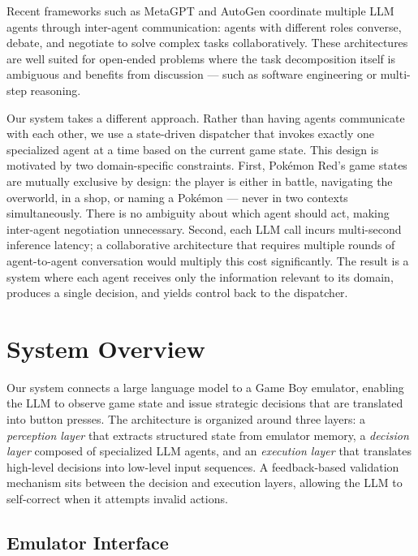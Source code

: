 \documentclass{article}
\begin{document}
Recent frameworks such as MetaGPT \citep{hong2024metagpt} and AutoGen \citep{wu2023autogen} coordinate multiple LLM agents through inter-agent communication: agents with different roles converse, debate, and negotiate to solve complex tasks collaboratively. These architectures are well suited for open-ended problems where the task decomposition itself is ambiguous and benefits from discussion --- such as software engineering or multi-step reasoning.

Our system takes a different approach. Rather than having agents communicate with each other, we use a state-driven dispatcher that invokes exactly one specialized agent at a time based on the current game state. This design is motivated by two domain-specific constraints. First, Pok\'{e}mon Red's game states are mutually exclusive by design: the player is either in battle, navigating the overworld, in a shop, or naming a Pok\'{e}mon --- never in two contexts simultaneously. There is no ambiguity about which agent should act, making inter-agent negotiation unnecessary. Second, each LLM call incurs multi-second inference latency; a collaborative architecture that requires multiple rounds of agent-to-agent conversation would multiply this cost significantly. The result is a system where each agent receives only the information relevant to its domain, produces a single decision, and yields control back to the dispatcher.


\section{System Overview}
\label{sec:system-overview}

Our system connects a large language model to a Game Boy emulator, enabling the LLM to observe game state and issue strategic decisions that are translated into button presses. The architecture is organized around three layers: a \emph{perception layer} that extracts structured state from emulator memory, a \emph{decision layer} composed of specialized LLM agents, and an \emph{execution layer} that translates high-level decisions into low-level input sequences. A feedback-based validation mechanism sits between the decision and execution layers, allowing the LLM to self-correct when it attempts invalid actions.

\subsection{Emulator Interface}
\end{document}
